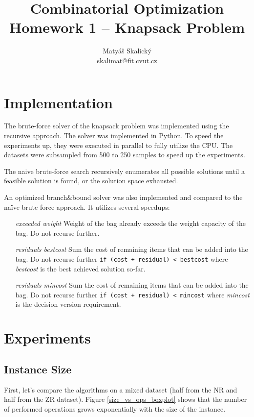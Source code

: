 \documentclass[a4paper,10pt]{article}
\title{Combinatorial Optimization\\Homework 1 – Knapsack Problem}
\author{Matyáš Skalický\\skalimat@fit.cvut.cz}
\begin{document}
\maketitle
\tableofcontents
\medskip


\section{Implementation}
The brute-force solver of the knapsack problem was implemented using the recursive approach. The solver was implemented in Python. To speed the experiments up, they were executed in parallel to fully utilize the CPU. The datasets were subsampled from 500 to 250 samples to speed up the experiments.

The naive brute-force search recursively enumerates all possible solutions until a feasible solution is found, or the solution space exhausted.

An optimized branch\&bound solver was also implemented and compared to the naïve brute-force approach. It utilizes several speedups:

\begin{enumerate}[leftmargin=1in]
	\item[\emph{exceeded weight}] Weight of the bag already exceeds the weight capacity of the bag. Do not recurse further.
	\item[\emph{residuals bestcost}] Sum the cost of remaining items that can be added into the bag. Do not recurse further \lstinline{if (cost + residual) < bestcost} where \emph{bestcost} is the best achieved solution so-far.
	\item[\emph{residuals mincost}] Sum the cost of remaining items that can be added into the bag. Do not recurse further \lstinline{if (cost + residual) < mincost} where \emph{mincost} is the decision version requirement.
\end{enumerate}

\clearpage

\section{Experiments}
\subsection{Instance Size}
First, let's compare the algorithms on a mixed dataset (half from the NR and half from the ZR dataset). Figure \ref{size_vs_ops_boxplot} shows that the number of performed operations grows exponentially with the size of the instance.
\end{document}
